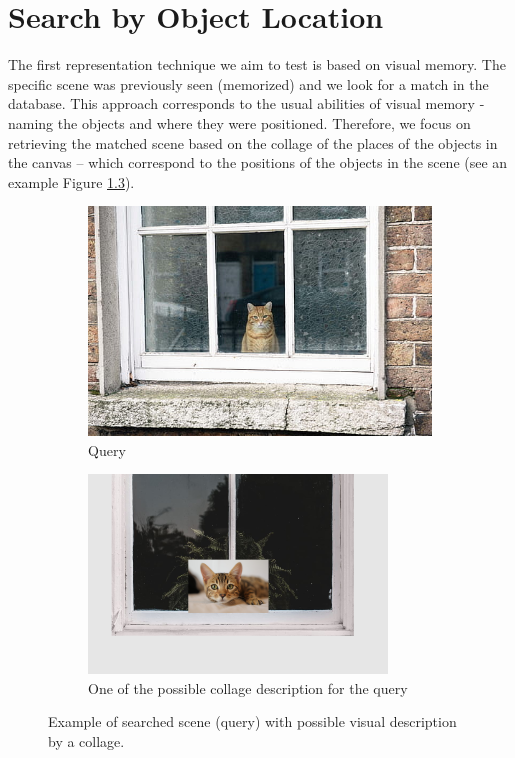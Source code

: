 \chapter{Search by Object Location}

The first representation technique we aim to test is based on visual memory. The specific scene was previously seen (memorized) and we look for a match in the database. This approach corresponds to the usual abilities of visual memory - naming the objects and where they were positioned. Therefore, we focus on retrieving the matched scene based on the collage of the places of the objects in the canvas -- which correspond to the positions of the objects in the scene (see an example Figure \ref{fig:query_collage_comparison}).

\begin{figure}
\centering

\begin{subfigure}[t]{0.45\textwidth}
\includegraphics[width=0.9\linewidth]{img/cat_on_window} 
\caption{Query}
\label{fig:searched_scene}
\end{subfigure}
\begin{subfigure}[t]{0.45\textwidth}
\includegraphics[width=0.9\linewidth]{img/cat_on_window_collage}
\caption{One of the possible collage description for the query}
\label{fig:collage_example}
\end{subfigure}

\caption{Example of searched scene (query) with possible visual description by a collage.}
\label{fig:query_collage_comparison}
\end{figure}


